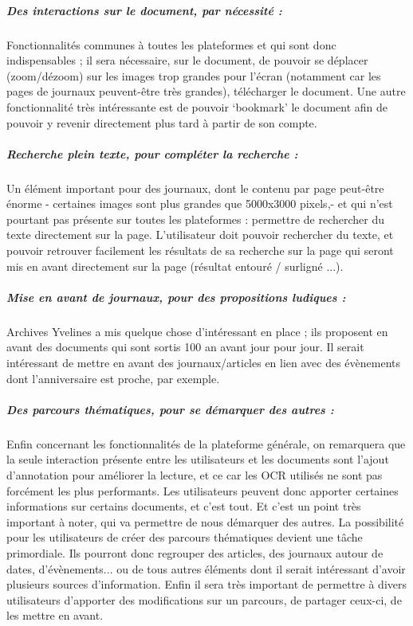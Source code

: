     \subparagraph{Des interactions sur le document, par nécessité :}
    Fonctionnalités communes à toutes les plateformes et qui sont donc indispensables ;
    il sera nécessaire, sur le document, de pouvoir se déplacer (zoom/dézoom) sur les images trop grandes
    pour l’écran (notamment car les pages de journaux peuvent-être très grandes), télécharger le document.
    Une autre fonctionnalité très intéressante est de pouvoir ‘bookmark’ le document afin de pouvoir
    y revenir directement plus tard à partir de son compte.

    \subparagraph{Recherche plein texte, pour compléter la recherche :}
    Un élément important pour des journaux, dont le contenu par page peut-être énorme - certaines images
    sont plus grandes que 5000x3000 pixels,- et qui n’est pourtant pas présente sur toutes les plateformes :
    permettre de rechercher du texte directement sur la page. L’utilisateur doit pouvoir rechercher du texte,
    et pouvoir retrouver facilement les résultats de sa recherche sur la page qui seront mis en avant directement
    sur la page (résultat entouré / surligné ...).

    \subparagraph{Mise en avant de journaux, pour des propositions ludiques :}
    Archives Yvelines a mis quelque chose d’intéressant en place ; ils proposent en avant des documents
    qui sont sortis 100 an avant jour pour jour. Il serait intéressant de mettre en avant des journaux/articles
    en lien avec des évènements dont l’anniversaire est proche, par exemple.

    \subparagraph{Des parcours thématiques, pour se démarquer des autres :}
    Enfin concernant les fonctionnalités de la plateforme générale, on remarquera que la seule interaction
    présente entre les utilisateurs et les documents sont l’ajout d’annotation pour améliorer la lecture,
    et ce car les OCR utilisés ne sont pas forcément les plus performants. Les utilisateurs peuvent donc apporter
    certaines informations sur certains documents, et c’est tout. Et c’est un point très important à noter,
    qui va permettre de nous démarquer des autres.  La possibilité pour les utilisateurs de créer des parcours thématiques
    devient une tâche primordiale. Ils pourront donc regrouper des articles, des journaux autour de dates, d’évènements...
    ou de tous autres éléments dont il serait intéressant d’avoir plusieurs sources d’information. Enfin il sera très important
    de permettre à divers utilisateurs d’apporter des modifications sur un parcours, de partager ceux-ci, de les mettre en avant.
